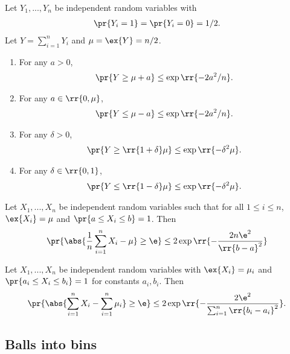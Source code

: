 \documentclass{article}
\begin{document}
\begin{corollary}
  Let $Y_1,...,Y_n$ be independent random variables with
  \begin{align*}
    \pr{Y_i=1}=\pr{Y_i=0}=1/2.
  \end{align*}
  Let $Y=\sum_{i=1}^{n} Y_i$ and $\mu=\ex{Y}=n/2$.
  \begin{enumerate}
    \item For any $a>0$, \begin{align*}
        \pr{Y\geq \mu+a}\leq \exp\rr{-2a^2/n}.
      \end{align*}
    \item For any $a\in\rr{0,\mu}$, \begin{align*}
        \pr{Y\leq \mu-a}\leq \exp\rr{-2a^2/n}.
      \end{align*}
    \item For any $\delta>0$, \begin{align*}
        \pr{Y\geq \rr{1+\delta}\mu}\leq \exp\rr{-\delta^2\mu}.
      \end{align*}
    \item For any $\delta\in\rr{0,1}$, \begin{align*}
        \pr{Y\leq \rr{1-\delta}\mu}\leq \exp\rr{-\delta^2\mu}.
      \end{align*}
  \end{enumerate}
\end{corollary}

\begin{theorem}
  Let $X_1,...,X_n$ be independent random variables such that for all $1\leq i\leq n$,
  $\ex{X_i}=\mu$ and $\pr{a\leq X_i\leq b}=1$. Then
  \begin{align*}
    \pr{\abs{\frac{1}{n}\sum_{i=1}^{n} X_i-\mu}\geq \e}\leq 2\exp\rr{-\frac{2n\e^2}{\rr{b-a}^2}}
  \end{align*}
\end{theorem}

\begin{theorem}
  Let $X_1,...,X_n$ be independent random variables with $\ex{X_i}=\mu_i$ and $\pr{a_i\leq X_i\leq b_i}=1$ for
  constants $a_i,b_i$. Then
  \begin{align*}
    \pr{\abs{\sum_{i=1}^{n} X_i - \sum_{i=1}^{n} \mu_i}\geq\e} \leq 2\exp\rr{-\frac{2\e^2}{\sum_{i=1}^{n} \rr{b_i-a_i}^2}}.
  \end{align*}
\end{theorem}

\subsection{Balls into bins}
\end{document}
